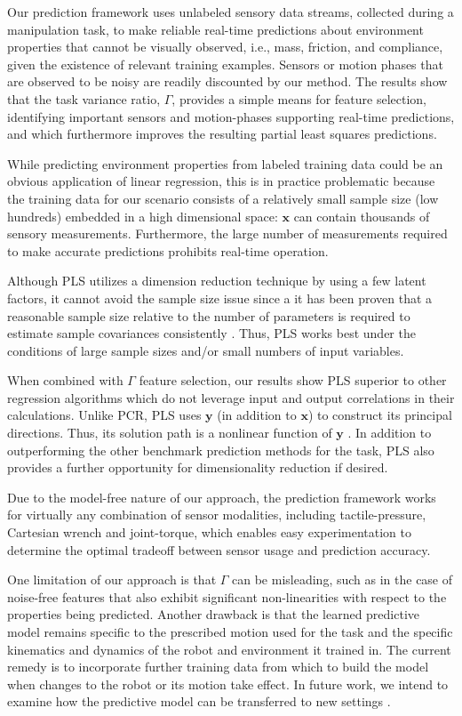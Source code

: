Our prediction framework uses unlabeled sensory data streams, collected during a manipulation task, to make reliable real-time predictions about environment properties that cannot be visually observed, i.e., mass, friction, and compliance, given the existence of relevant training examples.
Sensors or motion phases that are observed to be noisy are readily discounted by our method.
The results show that the task variance ratio, $\Gamma$, provides a simple means for feature selection, identifying important sensors and motion-phases supporting real-time predictions, and which furthermore improves the resulting partial least squares predictions.

While predicting environment properties from labeled training data could be an obvious application of linear regression, this is in practice problematic because the training data for our scenario consists of a relatively small sample size (low hundreds) embedded in a high dimensional space: $\mathbf{x}$ can contain thousands of sensory measurements.
Furthermore, the large number of measurements required to make accurate predictions prohibits real-time operation.

Although PLS utilizes a dimension reduction technique by using a few latent factors, it cannot avoid the sample size issue since a it has been proven that a reasonable sample size relative to the number of parameters is required to estimate sample covariances consistently \cite{chun2010sparse}.
Thus, PLS works best under the conditions of large sample sizes and/or small numbers of input variables. 

When combined with $\Gamma$ feature selection, our results show PLS superior to other regression algorithms which do not leverage input and output correlations in their calculations.
Unlike PCR, PLS uses $\mathbf{y}$ (in addition to $\mathbf{x}$) to construct its principal directions.
Thus, its solution path is a nonlinear function of $\mathbf{y}$ \cite{Friedman2001}.
In addition to outperforming the other benchmark prediction methods for the task, PLS also provides a further opportunity for dimensionality reduction if desired. 

Due to the model-free nature of our approach, the prediction framework works for virtually any combination of sensor modalities, including tactile-pressure, Cartesian wrench and joint-torque, 
which enables easy experimentation to determine the optimal tradeoff between sensor usage and prediction accuracy.

One limitation of our approach is that $\Gamma$ can be misleading, such as in the case of noise-free features that also exhibit significant non-linearities with respect to the properties being predicted. 
Another drawback is that the learned predictive model remains specific to the prescribed motion used for the task and the specific kinematics and dynamics of the robot and environment it trained in.
The current remedy is to incorporate further training data from which to build the model when changes to the robot or its motion take effect.
In future work, we intend to examine how the predictive model can be transferred to new settings \cite{pan2010survey}.

